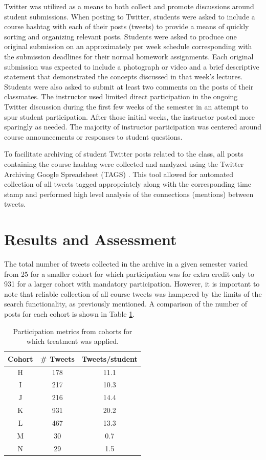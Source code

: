 \documentclass[12pt]{article}
\begin{document}
Twitter was utilized as a means to both collect and promote discussions around student submissions. When posting to Twitter, students were asked to include a course hashtag with each of their posts (tweets) to provide a means of quickly sorting and organizing relevant posts. Students were asked to produce one original submission on an approximately per week schedule corresponding with the submission deadlines for their normal homework assignments. Each original submission was expected to include a photograph or video and a brief descriptive statement that demonstrated  the concepts discussed in that week's lectures. Students were also asked to submit at least two comments on the posts of their classmates. The instructor used limited direct participation in the ongoing Twitter discussion during the first few weeks of the semester in an attempt to spur student participation. After those initial weeks, the instructor posted more sparingly as needed. The majority of instructor participation was centered around course announcements or responses to student questions.

To facilitate archiving of student Twitter posts related to the class, all posts containing the course hashtag were collected and analyzed using the Twitter Archiving Google Spreadsheet (TAGS) \cite{hawksey_twitter_2014}. This tool allowed for automated collection of all tweets tagged appropriately along with the corresponding time stamp and performed high level analysis of the connections (mentions) between tweets.

\section*{Results and Assessment}
The total number of tweets collected in the archive in a given semester varied from 25 for a smaller cohort for which participation was for extra credit only to 931 for a larger cohort with mandatory participation. However, it is important to note that reliable collection of all course tweets was hampered by the limits of the search functionality, as previously mentioned. A comparison of the number of posts for each cohort is shown in Table \ref{participation}.

\begin{table}[H]
\caption{Participation metrics from cohorts for which treatment was applied.}
\begin{center}
\label{participation}
\begin{tabular}{ccc}
\hline
 Cohort & \# Tweets & Tweets/student \\
\hline
 H & 178 & 11.1 \\
 I & 217 & 10.3 \\
 J & 216 & 14.4 \\
 K & 931 & 20.2 \\
 L & 467 & 13.3 \\
 M & 30 & 0.7 \\
 N & 29 & 1.5 \\
\hline
\end{tabular}
\end{center}
\end{table}
\end{document}
